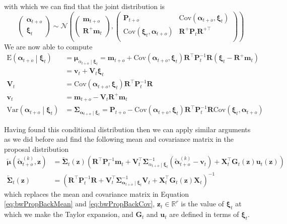 \documentclass[notitlepage]{article}
\renewcommand{\vec}[1]{\bm{#1}}
\newcommand{\vecLarrow}[1]{\overleftarrow{\vec{#1}}}
\newcommand{\mat}[1]{\mathbf{#1}}
\newcommand{\matLarrow}[1]{\overleftarrow{\mat{#1}}}
\newcommand{\Lparen}[1]{\left( #1\right)}
\newcommand{\Cond}[2]{ #1 \middle\vert  #2}
\newcommand{\VAR}{\text{Var}}
\newcommand{\E}{\text{E}}
\newcommand{\COV}{\text{Cov}}
\newcommand{\optor}[2]{#1\Lparen{#2}}
\newcommand{\optorC}[3]{\optor{#1}{\Cond{#2}{#3}}}
\newcommand{\expecC}[2]{\optorC{\E}{#1}{#2}}
\newcommand{\varpC}[2]{\optorC{\VAR}{#1}{#2}}
\newcommand{\covp}[1]{\optor{\COV}{#1}}
\newcommand\subCond[3]{#1_{\left. #2 \middle\vert #3\right.}}
\newcommand{\normal}[2]{\optor{\mathcal{N}}{#1,#2}}
\newcommand{\particB}[3]{\widetilde{#1}_{#2}^{\Lparen{#3}}}
\newcommand{\dimRng}{r}
\begin{document}
% 
with which we can find that the joint distribution is %
%
$$
\begin{pmatrix}
	\vec \alpha_{t + o} \\ \vec \xi_t
\end{pmatrix} \sim  \normal{%
	\begin{pmatrix} \vec m_{t+o} \\ \mat R^+\vec m_t  \end{pmatrix}}{%
	\begin{pmatrix}
		\mat P_{t + o} & \covp{\vec\alpha_{t + o}, \vec\xi_t} \\
		\covp{\vec\xi_t, \vec\alpha_{t + o}} &  \mat R^+\mat P_t \mat R^{+\top} \\
	\end{pmatrix}
}
$$%
% 
We are now able to compute %
%
\begin{align*}
\expecC{\vec \alpha_{t + o}}{\vec \xi_t} &= 
	\subCond{\vec\mu}{\alpha_{t + o}}{\vec\xi_t}
	= \vec m_{t + o} + \covp{\vec\alpha_{t + o}, \vec\xi_t}
		\mat R^\top\mat P_t^{-1} \mat R\Lparen{\vec\xi_t - \mat R^+\vec m_t} \\
	&= \vec v_t + \mat V_t\vec\xi_t \\
\mat V_t &= \covp{\vec\alpha_{t + o}, \vec\xi_t}\mat R^\top\mat P_t^{-1} \mat R \\
\vec v_t &= \vec m_{t + o} - \mat V_t\mat R^+\vec m_t \\
\varpC{\vec \alpha_{t + o}}{\vec \xi_t} &=
	\subCond{\mat\Sigma}{\vec\alpha_{t + o}}{\vec\xi_t} 
	= \mat P_{t + o} - \covp{\vec\alpha_{t + o}, \vec\xi_t}
		\mat R^\top\mat P_t^{-1} \mat R\covp{\vec\xi_t, \vec\alpha_{t + o}}
\end{align*}

Having found this conditional distribution then we can apply similar arguments as we did 
before and find the following mean and covariance matrix in the proposal distribution %
%
\begin{align*}
\vecLarrow\mu (\particB{\vec{\alpha}}{t + o}k, \vec z)
	&= \matLarrow\Sigma_t(\vec z)\Lparen{
	\mat R^\top\mat P_t^{-1}\vec m_t + 
	\mat V_t^\top\subCond{\mat\Sigma}{\alpha_{t + o}}{\vec\xi_t}^{-1}
	(\particB{\vec{\alpha}}{t + o}k - \vec v_t) + 
	\mat X_t^\top\mat G_t(\vec z)\vec u_t(\vec z)} \\
\matLarrow\Sigma_t(\vec z) &= 
	\Lparen{
		\mat R^\top\mat P_t^{-1} \mat R + 
		\mat V_t^\top\subCond{\mat\Sigma}{\vec{\alpha}_{t + o}}{\vec\xi_t}^{-1}\mat V_t + 
		\mat X_t^\top \mat G_t(\vec z) \mat X_t}^{-1}
\end{align*} %
%
which replaces the mean and covariance matrix in Equation \eqref{eq:bwPropBackMean} and \eqref{eq:bwPropBackCov},
$\vec z_t\in\mathbb R^\dimRng$ is the value of $\vec\xi_t$ at which we make the Taylor expansion, and
$\mat G_t$ and $\vec u_t$ are defined in terms of $\vec\xi_t$.
\end{document}

